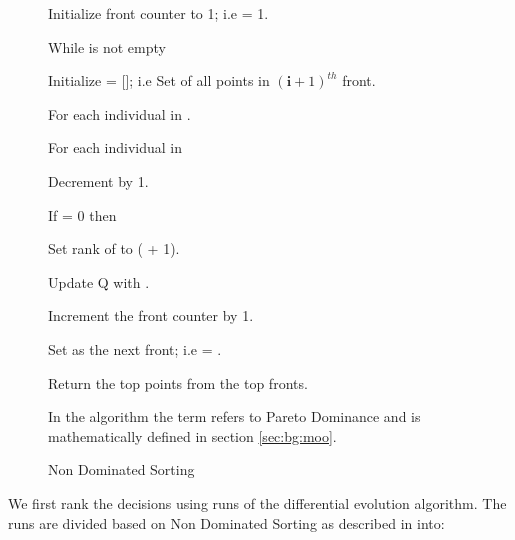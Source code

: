 \begin{figure}
\begin{mdframed}[backgroundcolor=white]
\begin{compactitem}
\begin{compactitem}
                \end{compactitem}
            \item Initialize front counter to 1; i.e  = 1.
            \item While  is not empty
                \begin{compactitem}
                    \item Initialize  = []; i.e Set of all points in $(\bm{i} + 1)^{th}$ front.
                    \item For each individual  in .
                    \begin{compactitem}
                        \item For each individual  in 
                        \begin{compactitem}
                            \item Decrement  by 1.
                            \item If  = 0 then
                            \begin{compactitem}
                                \item Set rank of  to ( + 1).
                                \item Update Q with .
                            \end{compactitem}
                        \end{compactitem}
                    \end{compactitem}
                    \item Increment the front counter  by 1.
                    \item Set  as the next front; i.e  = .
                \end{compactitem}
            \item Return the top  points from the top fronts.
        \end{compactitem}
        \bigskip
        In the algorithm the term  refers to Pareto Dominance \cite{deb01} and is mathematically defined in section \ref{sec:bg:moo}.
    \end{mdframed}
    \caption{Non Dominated Sorting}
    \label{fig:non_dom}
\end{figure}

We first rank the decisions using  runs of the differential evolution algorithm. The  runs are divided based on Non Dominated Sorting as described in  into:

